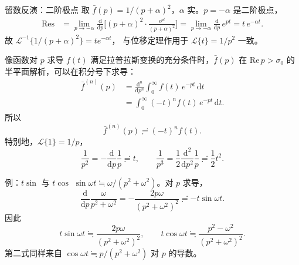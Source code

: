 \documentclass[fontset=windows, chinese, 10pt, xcolor=dvipsnames]{beamer}
\begin{document}
\begin{frame}{留数反演：二阶极点}
  取 $\bar f(p)=1/(p+\alpha)^2$，$\alpha$ 实。$p=-\alpha$ 是二阶极点，
  \begin{align*}
    \mathrm{Res}
    &=\lim_{p\to-\alpha}
      \frac{\mathrm{d}}{\mathrm{d}p}
      \bigl[(p+\alpha)^2\cdot\tfrac{e^{pt}}{(p+\alpha)^2}\bigr]
    =\lim_{p\to-\alpha}\frac{\mathrm{d}}{\mathrm{d}p}\,e^{pt}
    =t\,e^{-\alpha t}.
  \end{align*}
  故 $\mathcal{L}^{-1}\{1/(p+\alpha)^2\}=t e^{-\alpha t}$，
  与位移定理作用于 $\mathcal{L}\{t\}=1/p^2$ 一致。
\end{frame}

\begin{frame}{像函数对 $p$ 求导}
  $f(t)$ 满足拉普拉斯变换的充分条件时，$\bar f(p)$ 在 $\mathrm{Re}\,p>\sigma_0$ 的半平面解析，可以在积分号下求导：
  \begin{align*}
    \bar f^{(n)}(p)
    &=\frac{\mathrm{d}^n}{\mathrm{d}p^n}
      \int_0^{\infty} f(t)\,e^{-pt}\,\mathrm{d}t \\
    &=\int_0^{\infty}(-t)^n f(t)\,e^{-pt}\,\mathrm{d}t.
  \end{align*}
  所以
  \begin{equation*}
    \bar f^{(n)}(p)\risingdotseq (-t)^n f(t).
  \end{equation*}
  特别地，$\mathcal{L}\{1\}=1/p$，
  \begin{equation*}
    \frac{1}{p^2}=-\frac{\mathrm{d}}{\mathrm{d}p}\frac{1}{p}\risingdotseq t,
    \qquad
    \frac{1}{p^3}=\frac12\frac{\mathrm{d}^2}{\mathrm{d}p^2}\frac{1}{p}
      \risingdotseq\frac12 t^2.
  \end{equation*}
\end{frame}

\begin{frame}{例：$t\sin$ 与 $t\cos$}
  $\sin\omega t\fallingdotseq\omega/(p^2+\omega^2)$。对 $p$ 求导，
  \begin{equation*}
    \frac{\mathrm{d}}{\mathrm{d}p}\frac{\omega}{p^2+\omega^2}
    =-\frac{2p\omega}{(p^2+\omega^2)^2}
    \risingdotseq -t\sin\omega t.
  \end{equation*}
  因此
  \begin{equation*}
    t\sin\omega t
    \fallingdotseq\frac{2p\omega}{(p^2+\omega^2)^2},
    \qquad
    t\cos\omega t
    \fallingdotseq\frac{p^2-\omega^2}{(p^2+\omega^2)^2}.
  \end{equation*}
  第二式同样来自 $\cos\omega t\fallingdotseq p/(p^2+\omega^2)$ 对 $p$ 的导数。
\end{frame}
\end{document}
